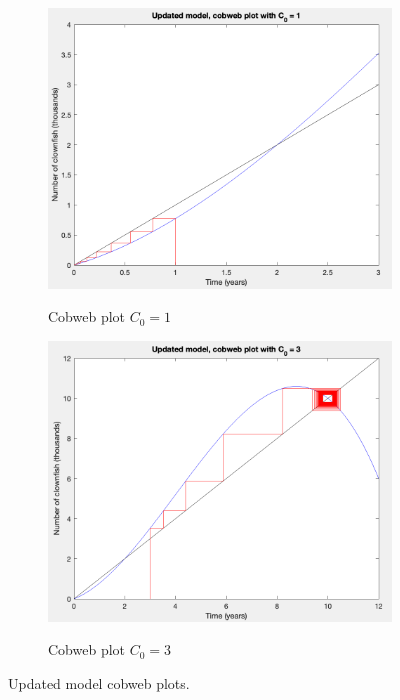 \documentclass[11pt, a4paper]{article}
\begin{document}
\begin{figure}[!h]
    \begin{subfigure}[b]{0.45\textwidth}
      \includegraphics[width=\textwidth]{images/clownfishplot2.png}
      \label{fig:f2}
      \caption{Cobweb plot $C_0 = 1$}
    \end{subfigure}
    \hfill
    \begin{subfigure}[b]{0.45\textwidth}
      \includegraphics[width=\textwidth]{images/clownfishplot3.png}
      \label{fig:f3}
      \caption{Cobweb plot $C_0 = 3$}
    \end{subfigure}
    \caption{Updated model cobweb plots.}
\end{figure}
\end{document}
